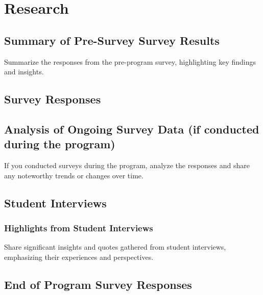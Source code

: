 \documentclass[
]{article}
\begin{document}
\hypertarget{research-1}{%
\section{Research}\label{research-1}}

\hypertarget{summary-of-pre-survey-survey-results}{%
\subsection{Summary of Pre-Survey Survey
Results}\label{summary-of-pre-survey-survey-results}}

Summarize the responses from the pre-program survey, highlighting key
findings and insights.

\hypertarget{survey-responses}{%
\subsection{Survey Responses}\label{survey-responses}}

\hypertarget{analysis-of-ongoing-survey-data-if-conducted-during-the-program}{%
\subsection{Analysis of Ongoing Survey Data (if conducted during the
program)}\label{analysis-of-ongoing-survey-data-if-conducted-during-the-program}}

If you conducted surveys during the program, analyze the responses and
share any noteworthy trends or changes over time.

\hypertarget{student-interviews}{%
\subsection{Student Interviews}\label{student-interviews}}

\hypertarget{highlights-from-student-interviews}{%
\subsubsection{Highlights from Student
Interviews}\label{highlights-from-student-interviews}}

Share significant insights and quotes gathered from student interviews,
emphasizing their experiences and perspectives.

\hypertarget{end-of-program-survey-responses}{%
\subsection{End of Program Survey
Responses}\label{end-of-program-survey-responses}}
\end{document}
